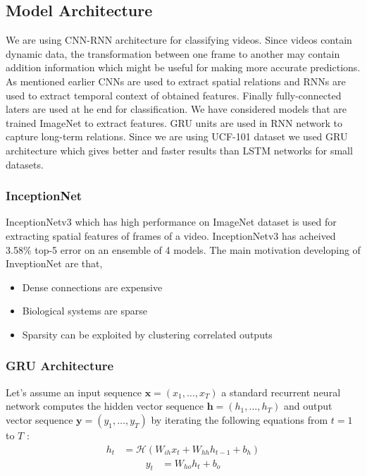 \documentclass[10pt,twocolumn,letterpaper]{article}
\begin{document}
\subsection{Model Architecture}
We are using CNN-RNN architecture for classifying videos. Since videos contain dynamic data, the transformation between one frame to another may contain addition information which might be useful for making more accurate predictions. As mentioned earlier CNNs are used to extract spatial relations and RNNs are used to extract temporal context of obtained features. Finally fully-connected laters are used at he end for classification. We have considered models that are trained ImageNet to extract features. GRU units are used in RNN network to capture long-term relations. Since we are using UCF-101 dataset we used GRU architecture which gives better and faster results than LSTM networks for small datasets.

\subsubsection{InceptionNet}
InceptionNetv3 which has high performance on ImageNet dataset is used for extracting spatial features of frames of a video. InceptionNetv3 has acheived 3.58\% top-5 error on an ensemble of 4 models. The main motivation developing of InveptionNet are that, 
\begin{itemize}
\setlength\itemsep{0.01em}
\item Dense connections are expensive
\item Biological systems are sparse
\item Sparsity can be exploited by clustering correlated outputs
\end{itemize}

\subsubsection{GRU Architecture}
Let's assume an input sequence $\mathbf{x}=\left(x_{1}, \ldots, x_{T}\right)$ a standard recurrent neural network computes the hidden vector sequence $\mathbf{h}=\left(h_{1}, \ldots, h_{T}\right)$ and output vector sequence $\mathbf{y}=\left(y_{1}, \ldots, y_{T}\right)$ by iterating the following equations from $t=1$ to $T$ :
\begin{equation}
\begin{aligned}
h_{t} &=\mathcal{H}\left(W_{i h} x_{t}+W_{h h} h_{t-1}+b_{h}\right)
\end{aligned}
\end{equation}
\begin{equation}
\begin{aligned}
y_{t} &=W_{h o} h_{t}+b_{o}
\end{aligned}
\end{equation}
\end{document}
